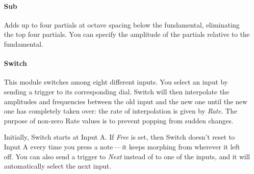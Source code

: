 \documentclass{article}
\begin{document}

\paragraph{Sub} Adds up to four partials at octave spacing below the fundamental, eliminating the top four partials.  You can specify the amplitude of the partials relative to the fundamental.


\paragraph{Switch} This module switches among eight different inputs.  You select an input by sending a trigger to its corresponding dial.  Switch will then interpolate the amplitudes and frequencies between the old input and the new one until the new one has completely taken over: the rate of interpolation is given by {\it Rate}.  The purpose of non-zero Rate values is to prevent popping from sudden changes.

Initially, Switch starts at Input A.  If {\it Free} is set, then Switch doesn't reset to Input A every time you press a note\,---\,it keeps morphing from wherever it left off.  You can also send a trigger to {\it Next} instead of to one of the inputs, and it will automatically select the next input.
\end{document}
